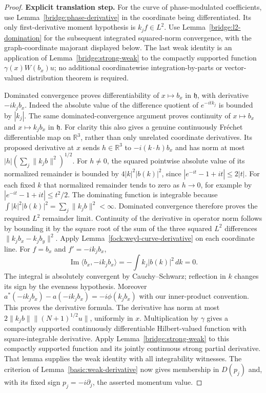 \documentclass[11pt,a4paper]{article}
\theoremstyle{definition}
\theoremstyle{remark}
\begin{document}
\begin{proof}
\noindent\textbf{Explicit translation step.} For the curve of phase-modulated coefficients, use
Lemma~\ref{bridge:phase-derivative} in the coordinate being differentiated.
Its only first-derivative moment hypothesis is $k_jf\in L^2$.
Use Lemma~\ref{bridge:l2-domination} for the subsequent integrated
squared-norm convergence, with the graph-coordinate majorant displayed
below.
The last weak identity is an application of
Lemma~\ref{bridge:strong-weak} to the compactly supported function
$\gamma(x)W(b_x)u$; no additional coordinatewise integration-by-parts
or vector-valued distribution theorem is required.

Dominated convergence proves differentiability of $x\mapsto b_x$ in
$\mathfrak h$, with derivative $-ik_jb_x$. Indeed the absolute value
of the difference quotient of $e^{-itk_j}$ is bounded by $|k_j|$.
The same dominated-convergence argument proves continuity of
$x\mapsto b_x$ and $x\mapsto k_jb_x$ in $\mathfrak h$.
For clarity this also gives a genuine continuously Fr\'echet
differentiable map on $\mathbb R^3$, rather than only unrelated
coordinate derivatives. Its proposed derivative at $x$ sends
$h\in\mathbb R^3$ to $-i(k\cdot h)b_x$ and has norm at most
$|h|(\sum_j\|k_jb\|^2)^{1/2}$. For $h\ne0$, the squared
pointwise absolute value of its normalized remainder is bounded by
$4|k|^2|b(k)|^2$, since
$|e^{-it}-1+it|\leq2|t|$. For each fixed $k$ that normalized
remainder tends to zero as $h\to0$, for example by
$|e^{-it}-1+it|\leq t^2/2$. The dominating function is integrable
because $\int|k|^2|b(k)|^2=\sum_j\|k_jb\|^2<\infty$.
Dominated convergence therefore proves the required $L^2$ remainder
limit. Continuity of the derivative in operator norm follows by
bounding it by the square root of the sum of the three squared
$L^2$ differences $\|k_jb_x-k_jb_y\|^2$.
Apply Lemma~\ref{fock:weyl-curve-derivative} on each coordinate line.
For $f=b_x$ and $f'=-ik_jb_x$,
\[
 \operatorname{Im}\langle b_x,-ik_jb_x\rangle
       =-\int k_j|b(k)|^2\,dk=0.
\]
The integral is absolutely convergent by Cauchy--Schwarz; reflection in
$k$ changes its sign by the evenness hypothesis. Moreover
$a^*(-ik_jb_x)-a(-ik_jb_x)=-i\phi(k_jb_x)$ with our inner-product
convention. This proves the derivative formula. The derivative has
norm at most $2\|k_jb\|\|(N+1)^{1/2}u\|$, uniformly in $x$.
Multiplication by $\gamma$ gives a compactly supported continuously
differentiable Hilbert-valued function with square-integrable
derivative. Apply Lemma~\ref{bridge:strong-weak} to this compactly supported
function and its jointly continuous strong partial derivative. That
lemma supplies the weak identity with all integrability witnesses.
The criterion of Lemma~\ref{basic:weak-derivative} now gives membership
in $D(p_j)$ and, with its fixed sign $p_j=-i\partial_j$, the asserted
momentum value.
\end{proof}
\end{document}
